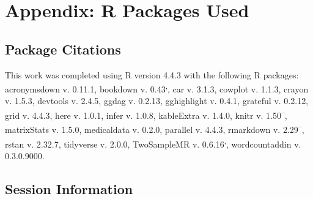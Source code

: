\documentclass[
]{article}
\begin{document}
\newpage

\section{Appendix: R Packages Used}\label{appendix-pkg}

\subsection{Package Citations}\label{package-citations}

This work was completed using R version 4.4.3\textsuperscript{} with the following R packages: acronymsdown v. 0.11.1\textsuperscript{}, bookdown v. 0.43\textsuperscript{,}, car v. 3.1.3\textsuperscript{}, cowplot v. 1.1.3\textsuperscript{}, crayon v. 1.5.3\textsuperscript{}, devtools v. 2.4.5\textsuperscript{}, ggdag v. 0.2.13\textsuperscript{}, gghighlight v. 0.4.1\textsuperscript{}, grateful v. 0.2.12\textsuperscript{}, grid v. 4.4.3\textsuperscript{}, here v. 1.0.1\textsuperscript{}, infer v. 1.0.8\textsuperscript{}, kableExtra v. 1.4.0\textsuperscript{}, knitr v. 1.50\textsuperscript{--}, matrixStats v. 1.5.0\textsuperscript{}, medicaldata v. 0.2.0\textsuperscript{}, parallel v. 4.4.3\textsuperscript{}, rmarkdown v. 2.29\textsuperscript{--}, rstan v. 2.32.7\textsuperscript{}, tidyverse v. 2.0.0\textsuperscript{}, TwoSampleMR v. 0.6.16\textsuperscript{,}, wordcountaddin v. 0.3.0.9000\textsuperscript{}.

\subsection{Session Information}\label{session-information}
\end{document}

